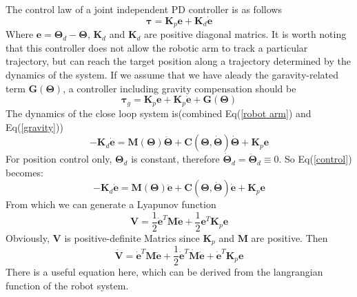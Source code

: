 \documentclass[a4paper]{article}
\begin{document}
The control law of a joint independent PD controller is as follows
\begin{equation}
\boldsymbol{\tau} = \boldsymbol{K}_p\boldsymbol{e} + \boldsymbol{K}_d\boldsymbol{\dot e}
\end{equation}
Where $\boldsymbol {e} = \boldsymbol{\Theta}_d - \boldsymbol{\Theta}$, $\boldsymbol{K}_d$ and $\boldsymbol{K}_d$ are positive diagonal matrics. It is worth noting that this controller does not allow the robotic arm to track a particular trajectory, but can reach the target position along a trajectory determined by the dynamics of the system. 
If we assume that we have aleady the garavity-related term $\boldsymbol{G(\Theta)}$, a controller including gravity compensation should be
\begin{equation}
\boldsymbol{\tau}_g = \boldsymbol{K}_p\boldsymbol{e} + \boldsymbol{K}_p\boldsymbol{\dot e} + \boldsymbol{G(\Theta)}
\label{gravity}
\end{equation}
The dynamics of the close loop system is(combined Eq(\ref{robot arm}) and Eq(\ref{gravity}))
\begin{equation}
-\boldsymbol{K}_d \boldsymbol{\dot e}= \boldsymbol{M(\Theta) \ddot{\Theta}}+\boldsymbol{C(\Theta,\dot{\Theta})\dot{\Theta}} + \boldsymbol{K}_p\boldsymbol{e}
\label{control}
\end{equation}
For position control only, $\boldsymbol{\Theta}_d$ is constant, therefore $\boldsymbol{\dot\Theta}_d = \boldsymbol{\ddot\Theta}_d \equiv 0$. So Eq(\ref{control}) becomes:
\begin{equation}
-\boldsymbol{K}_d \boldsymbol{\dot e}= \boldsymbol{M(\Theta) \ddot{e}}+\boldsymbol{C(\Theta,\dot{\Theta})\dot{e}} + \boldsymbol{K}_p\boldsymbol{e}
\end{equation}
From which we can generate a Lyapunov function
\begin{equation}
\boldsymbol{V} = \frac 12 \boldsymbol{\dot e}^T\boldsymbol{M}\boldsymbol{\dot e} + \frac 12 \boldsymbol{e}^T\boldsymbol{K}_p\boldsymbol{e} 
\end{equation}
Obviously, $\boldsymbol{V}$ is positive-definite Matrics since $\boldsymbol{K}_p$ and $\boldsymbol{M}$ are positive. Then
\begin{equation}
\boldsymbol{\dot V} = \boldsymbol{\dot e}^T\boldsymbol{M}\boldsymbol{\ddot e} + \frac 12 \boldsymbol{\dot e}^T\boldsymbol{\dot M}\boldsymbol{\dot e} + \boldsymbol{\dot e}^T\boldsymbol{K}_p\boldsymbol{e} 
\end{equation}
There is a useful equation here, which can be derived from the langrangian function of the robot system{\cite{ref2}}.
\end{document}

